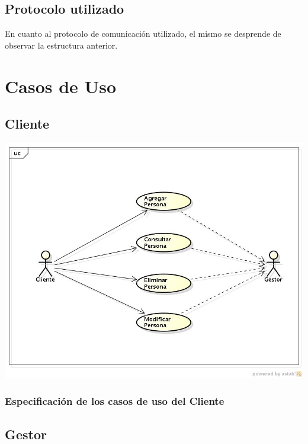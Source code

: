 \documentclass[11pt]{article}
\begin{document}
\subsection{Protocolo utilizado}

En cuanto al protocolo de comunicaci\'on utilizado, el mismo se desprende de observar la estructura anterior. 



\section{Casos de Uso}

\subsection{Cliente}

\begin{center}
\includegraphics[scale=0.65]{CasosUsoCliente} 
\end{center}

\subsubsection{Especificaci\'on de los casos de uso del Cliente}

\subsection{Gestor}

\end{document}
